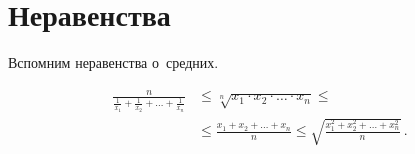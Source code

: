 
\section*{Неравенства}


Вспомним неравенства о~средних.

\begin{align*}
    \frac{n}{
        \frac{1}{x_1} + \frac{1}{x_2} + \ldots + \frac{1}{x_n}
    }
& \leq
    \sqrt[n]{x_1 \cdot x_2 \cdot \ldots \cdot x_n}
\leq \\ & \leq
    \frac{x_1 + x_2 + \ldots + x_n}{n}
\leq
    \sqrt{\frac{x_1^2 + x_2^2 + \ldots + x_n^2}{n}}
\, . \end{align*}

